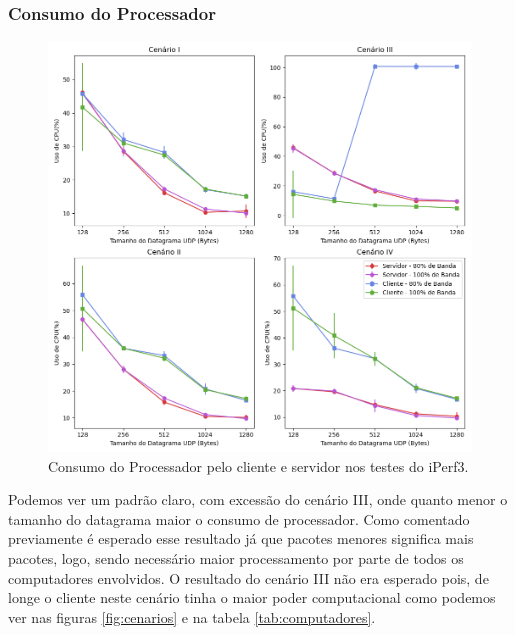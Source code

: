 \subsubsection{Consumo do Processador}

\begin{figure}[H]
    \centering
    \includegraphics[width=0.9\linewidth]{sources/fig-cpu.png}
    \caption{Consumo do Processador pelo cliente e servidor nos testes do iPerf3.}
    \label{fig:cpu}
\end{figure}

Podemos ver um padrão claro, com excessão do cenário III, onde quanto menor o tamanho do datagrama maior o consumo de processador. Como comentado previamente é esperado esse resultado já que pacotes menores significa mais pacotes, logo, sendo necessário maior processamento por parte de todos os computadores envolvidos. O resultado do cenário III não era esperado pois, de longe o cliente neste cenário tinha o maior poder computacional como podemos ver nas figuras \ref{fig:cenarios} e na tabela \ref{tab:computadores}.




